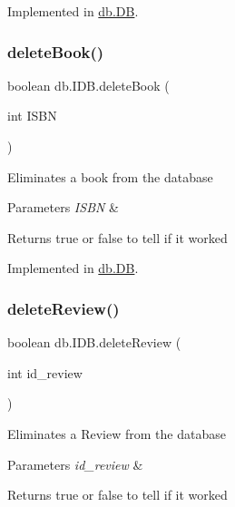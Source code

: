 Implemented in \hyperlink{classdb_1_1_d_b_a8a1a15bae4352c3c73092d801ef26c41}{db.\+DB}.

\mbox{\label{interfacedb_1_1_i_d_b_a8fa065455c75f33b9713b8d5058a0e30}} 
\subsubsection{\texorpdfstring{delete\+Book()}{deleteBook()}}
{\footnotesize\ttfamily boolean db.\+I\+D\+B.\+delete\+Book (\begin{DoxyParamCaption}\item[{int}]{I\+S\+BN }\end{DoxyParamCaption})}

Eliminates a book from the database 
\begin{DoxyParams}{Parameters}
{\em I\+S\+BN} & \\
\hline
\end{DoxyParams}
\begin{DoxyReturn}{Returns}
true or false to tell if it worked 
\end{DoxyReturn}


Implemented in \hyperlink{classdb_1_1_d_b_a712d418878efa15112c62eb6db4b022d}{db.\+DB}.

\mbox{\label{interfacedb_1_1_i_d_b_a37810242fa48895f21f790ef6a367225}} 
\subsubsection{\texorpdfstring{delete\+Review()}{deleteReview()}}
{\footnotesize\ttfamily boolean db.\+I\+D\+B.\+delete\+Review (\begin{DoxyParamCaption}\item[{int}]{id\+\_\+review }\end{DoxyParamCaption})}

Eliminates a Review from the database 
\begin{DoxyParams}{Parameters}
{\em id\+\_\+review} & \\
\hline
\end{DoxyParams}
\begin{DoxyReturn}{Returns}
true or false to tell if it worked 
\end{DoxyReturn}


